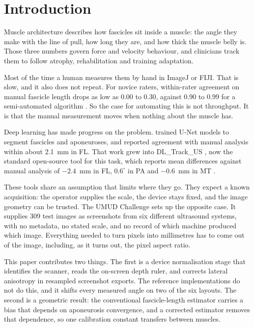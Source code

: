 \documentclass[12pt]{article}
\begin{document}
\newpage
\section{Introduction}

Muscle architecture describes how fascicles sit inside a muscle: the angle they
make with the line of pull, how long they are, and how thick the muscle belly
is. Those three numbers govern force and velocity behaviour, and clinicians
track them to follow atrophy, rehabilitation and training adaptation.

Most of the time a human measures them by hand in ImageJ or FIJI. That is slow,
and it also does not repeat. For novice raters, within-rater agreement on manual
fascicle length drops as low as 0.00 to 0.30, against 0.90 to 0.99 for a
semi-automated algorithm \citep{frontiers2025}. So the case for automating this
is not throughput. It is that the manual measurement moves when nothing about
the muscle has.

Deep learning has made progress on the problem. \citet{cronin2020} trained U-Net
models to segment fascicles and aponeuroses, and reported agreement with manual
analysis within about 2.1~mm in FL. That work grew into DL\_Track\_US
\citep{ritsche2022}, now the standard open-source tool for this task, which
reports mean differences against manual analysis of $-2.4$~mm in FL,
$0.6^{\circ}$ in PA and $-0.6$~mm in MT \citep{ritsche2024}.

These tools share an assumption that limits where they go. They expect a known
acquisition: the operator supplies the scale, the device stays fixed, and the
image geometry can be trusted. The UMUD Challenge sets up the opposite case. It
supplies 309 test images as screenshots from six different ultrasound systems,
with no metadata, no stated scale, and no record of which machine produced which
image. Everything needed to turn pixels into millimetres has to come out of the
image, including, as it turns out, the pixel aspect ratio.

This paper contributes two things. The first is a device normalisation stage
that identifies the scanner, reads the on-screen depth ruler, and corrects
lateral anisotropy in resampled screenshot exports. The reference
implementations do not do this, and it shifts every measured angle on two of the
six layouts. The second is a geometric result: the conventional fascicle-length
estimator carries a bias that depends on aponeurosis convergence, and a
corrected estimator removes that dependence, so one calibration constant
transfers between muscles.
\end{document}
